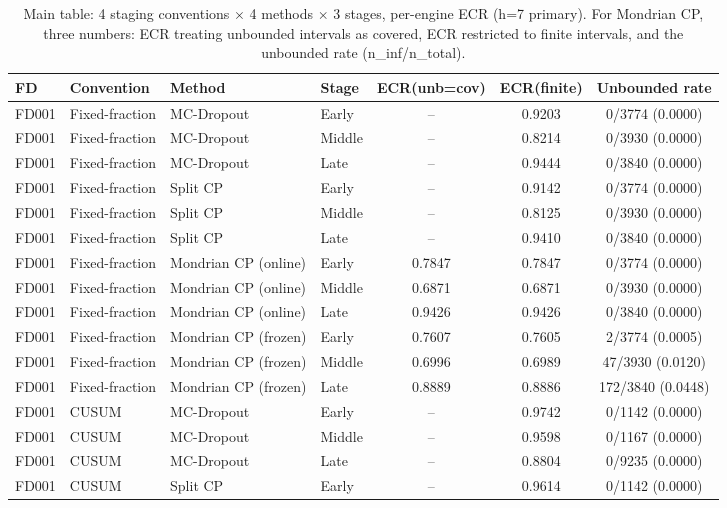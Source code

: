 \begin{table}[t]
\caption{Main table: 4 staging conventions $\times$ 4 methods $\times$ 3 stages, per-engine ECR (h=7 primary). For Mondrian CP, three numbers: ECR treating unbounded intervals as covered, ECR restricted to finite intervals, and the unbounded rate (n\_inf/n\_total).}
\label{tab:main-final}
\centering
\small
\begin{tabular}{llllccc}
\toprule
FD & Convention & Method & Stage & ECR(unb=cov) & ECR(finite) & Unbounded rate \\
\midrule
FD001 & Fixed-fraction & MC-Dropout & Early & -- & 0.9203 & 0/3774 (0.0000) \\
FD001 & Fixed-fraction & MC-Dropout & Middle & -- & 0.8214 & 0/3930 (0.0000) \\
FD001 & Fixed-fraction & MC-Dropout & Late & -- & 0.9444 & 0/3840 (0.0000) \\
FD001 & Fixed-fraction & Split CP & Early & -- & 0.9142 & 0/3774 (0.0000) \\
FD001 & Fixed-fraction & Split CP & Middle & -- & 0.8125 & 0/3930 (0.0000) \\
FD001 & Fixed-fraction & Split CP & Late & -- & 0.9410 & 0/3840 (0.0000) \\
FD001 & Fixed-fraction & Mondrian CP (online) & Early & 0.7847 & 0.7847 & 0/3774 (0.0000) \\
FD001 & Fixed-fraction & Mondrian CP (online) & Middle & 0.6871 & 0.6871 & 0/3930 (0.0000) \\
FD001 & Fixed-fraction & Mondrian CP (online) & Late & 0.9426 & 0.9426 & 0/3840 (0.0000) \\
FD001 & Fixed-fraction & Mondrian CP (frozen) & Early & 0.7607 & 0.7605 & 2/3774 (0.0005) \\
FD001 & Fixed-fraction & Mondrian CP (frozen) & Middle & 0.6996 & 0.6989 & 47/3930 (0.0120) \\
FD001 & Fixed-fraction & Mondrian CP (frozen) & Late & 0.8889 & 0.8886 & 172/3840 (0.0448) \\
FD001 & CUSUM & MC-Dropout & Early & -- & 0.9742 & 0/1142 (0.0000) \\
FD001 & CUSUM & MC-Dropout & Middle & -- & 0.9598 & 0/1167 (0.0000) \\
FD001 & CUSUM & MC-Dropout & Late & -- & 0.8804 & 0/9235 (0.0000) \\
FD001 & CUSUM & Split CP & Early & -- & 0.9614 & 0/1142 (0.0000) \\

\end{tabular}
\end{table}
